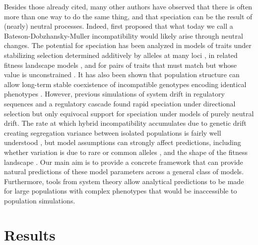 \documentclass{article}
\newcommand{\1}{\mathbbm{1}}
\begin{document}
Besides those already cited, many other authors have observed
that there is often more than one way to do the same thing, 
and that speciation can be the result of (nearly) neutral processes.
Indeed, \citet{bateson1909heredity} first proposed that what today we call a
Bateson-Dobzhansky-Muller incompatibility would likely arise through neutral changes. 
The potential for speciation has been analyzed in models of 
traits under stabilizing selection determined additively by alleles at many loci 
\citep{wright1935evolution,barton1986maintenance,barton1989divergence,barton2001role},
in related fitness landscape models \citep{fraisse2016genetics},
and for pairs of traits that must match but whose value is unconstrained \citep{sved1981twosex}.
It has also been shown that population structure
can allow long-term stable coexistence of incompatible genotypes encoding identical phenotypes \citep{phillips1996maintenance}. 
However, previous simulations of system drift in regulatory sequences \citep{tulchinsky2014hybrid}
and a regulatory cascade \citep{porter2002speciation}
found rapid speciation under directional selection
but only equivocal support for speciation under models of purely neutral drift.
The rate at which hybrid incompatibility accumulates due to genetic drift creating
segregation variance between isolated populations is fairly well understood
\citep{slatkin1994segregation,rosas2010cryptic,chevin2014niche},
but model assumptions can strongly affect predictions,
including whether variation is due to rare or common alleles \citep{slatkin1994segregation},
and the shape of the fitness landscape \citep{fraisse2016genetics}.
Our main aim is to provide a concrete framework 
that can provide natural predictions of these model parameters
across a general class of models.
Furthermore, tools from system theory allow analytical predictions to be made
for large populations with complex phenotypes
that would be inaccessible to population simulations.


\section*{Results}
\end{document}
